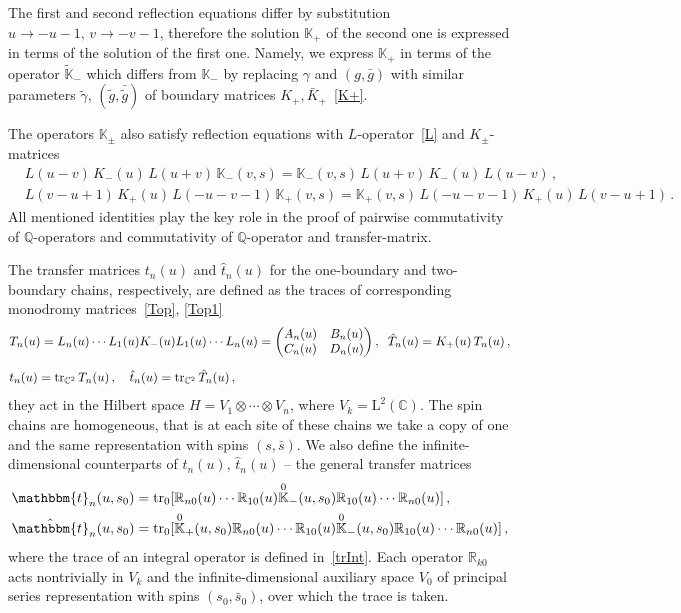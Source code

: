\documentclass[a4paper,11pt]{article}
\newcommand{\tr}{\mathop{\rm tr}\nolimits}
\numberwithin{equation}{section}
\begin{document}
The first and second reflection equations differ by substitution $u\to-u-1,\,v\to-v-1$, therefore the solution
$\mathbb{K}_+$ of the second one is expressed in terms of the solution of the first one. Namely, we express $\mathbb{K}_+$ in terms of the operator $\tilde{\mathbb{K}}_-$ which differs from $\mathbb{K}_-$ by replacing $\gamma$ and $(g,\bar{g})$ with similar parameters $\tilde{\gamma}$, $(\tilde{g},\bar{\tilde{g}})$ of boundary matrices $K_+, \bar{K}_+$~\eqref{K+}.

The operators $\mathbb{K}_{\pm}$ also satisfy reflection equations with $L$-operator~\eqref{L} and $K_\pm$-matrices
\begin{align*} 
	&L(u-v)\,K_-(u)\,L(u+v)\,\mathbb{K}_-(v,s) = 
	\mathbb{K}_-(v,s)\,L(u+v)\,K_-(u)\,L(u-v) \,,\\
	&L(v-u+1)\,K_+(u)\,L(-u-v-1)\,\mathbb{K}_+(v,s) = 
	\mathbb{K}_+(v,s)\,L(-u-v-1)\,K_+(u)\,L(v-u+1) \,.
\end{align*}
All mentioned identities play the key role in the proof of pairwise commutativity of $\mathbb{Q}$-operators and commutativity of $\mathbb{Q}$-operator and transfer-matrix.

The transfer matrices $t_n(u)$ and $\hat{t}_n(u)$ for the one-boundary and two-boundary chains, respectively, are defined as the traces of corresponding monodromy matrices~\eqref{Top}, \eqref{Top1}
\begin{align*}
	&
	T_n(u) = L_n(u) \cdots L_1(u) K_-(u) L_1(u) \cdots L_n(u) = \begin{pmatrix}
		A_n(u) & B_n(u) \\
		C_n(u) & D_n(u)
	\end{pmatrix}, \;\;
	\hat{T}_n(u) = K_+(u)\,T_n(u) \,, \\[0.6em]
	&
	t_n(u) = \tr_{\mathbb{C}^2} T_n(u) \,, \quad \hat{t}_n(u) = \tr_{\mathbb{C}^2} \hat{T}_n(u) \,,
\end{align*}
they act in the Hilbert space $H=V_1\otimes\cdots\otimes V_n$, where $V_k=\mathrm{L}^2(\mathbb{C})$.
The spin chains are homogeneous, that is at each site of these chains we take a copy of one and the same representation with spins $(s,\bar{s})$.
We also define the infinite-dimensional counterparts of $t_n(u)$, $\hat{t}_n(u)$ -- the general transfer matrices
\begin{align*}
	&\mathbbm{t}_n(u,s_0) = \operatorname{tr}_0[\mathbb{R}_{n0}(u)\cdots \mathbb{R}_{10}(u)\overset{0}{\mathbb{K}}_-(u,s_0)\mathbb{R}_{10}(u)\cdots \mathbb{R}_{n0}(u)] \,, \\
	&\hat{\mathbbm{t}}_n(u,s_0) = \operatorname{tr}_0[\overset{0}{\mathbb{K}}_+(u,s_0)\mathbb{R}_{n0}(u)\cdots \mathbb{R}_{10}(u)\overset{0}{\mathbb{K}}_-(u,s_0)\mathbb{R}_{10}(u)\cdots \mathbb{R}_{n0}(u)] \,,
\end{align*}
where the trace of an integral operator is defined in~\eqref{trInt}. Each operator $\mathbb{R}_{k0}$ acts nontrivially in $V_k$ and the infinite-dimensional auxiliary space $V_0$ of principal series representation with spins $(s_0,\bar{s}_0)$, over which the trace is taken.
\end{document}
